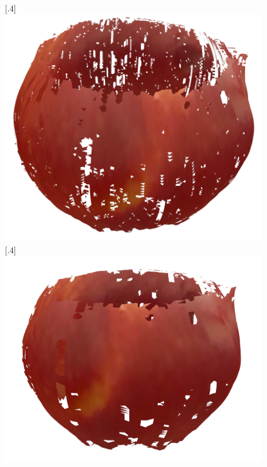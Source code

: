 \begin{figure}[H]
\centering
{}%
  [.4\linewidth]{\includegraphics[scale=0.3]{bpaApple2x.PNG}}
  [.4\linewidth]{\includegraphics[scale=0.3]{bpaApple5x.PNG}}

\end{figure}
